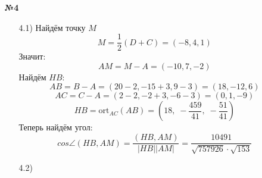 \documentclass[a4paper]{article}
\renewcommand{\f}[2]{\frac{#1}{#2}}
\begin{document}
\begin{enumerate}
    \item[\textbf{№4}]\begin{enumerate}
        \item[4.1)] Найдём точку $M$
        $$M = \f{1}{2}(D+C) = (-8, 4, 1)$$
        Значит:
        $$AM = M - A = (-10, 7, -2)$$
        Найдём $HB$:
        $$AB = B - A = (20-2, -15+3, 9-3) = (18, -12, 6)$$
        $$AC = C - A = (2- 2, -2 +3, -6-3) = (0, 1, -9)$$
        $$HB = \text{ort}_{AC} (AB) =  \left(18,\; -\frac{459}{41},\; -\frac{51}{41}\right)$$
        Теперь найдём угол:
        $$cos \angle (HB, AM) = \f{(HB, AM)}{|HB||AM|} = \dfrac{10491}{\sqrt{757926} \cdot \sqrt{153}}$$


        \item[4.2)]
    \end{enumerate}


\end{enumerate}
\end{document}
